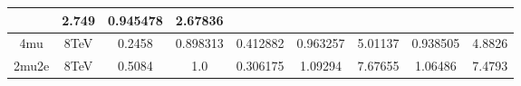 \begin{table}[b]
\begin{tabular}{c c c c c c c c c}
 & 2.749%
 & 0.945478 & 2.67836 \\ \hline 4mu & 8TeV & 0.2458 & 0.898313 & 0.412882 & 0.963257
 & 5.01137%
 & 0.938505 & 4.8826 \\ \hline 2mu2e & 8TeV & 0.5084 & 1.0  & 0.306175 & 1.09294
 & 7.67655%
 & 1.06486 & 7.4793 \\ \hline \hline 
\end{tabular}
\label{table:HZZ4lyieldcorr_spin0}
\end{table}


